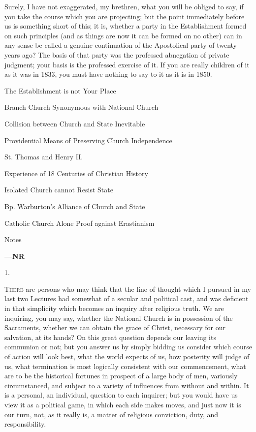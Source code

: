 Surely, I have not exaggerated, my brethren, what you will be
obliged to say, if you take the course which you are projecting; but
the point immediately before us is something short of this; it is,
whether a party in the Establishment formed on such principles (and as
things are now it can be formed on no other) can in any sense be
called a genuine continuation of the Apostolical party of twenty years
ago? The basis of that party was the professed abnegation of private
judgment; your basis is the professed exercise of it. If you are
really children of it as it was in 1833, you must have nothing to say
to it as it is in 1850.


The Establishment is not Your Place

Branch Church Synonymous
with National Church

Collision between Church and
State Inevitable

Providential Means of Preserving
Church Independence

St. Thomas and Henry II.

Experience of 18 Centuries of
Christian History

Isolated Church cannot Resist State

Bp. Warburton's Alliance of Church
and State

Catholic Church Alone Proof
against Erastianism

Notes

\textbf{—NR}

1.

T\textsc{here} are persons who may think that the line of thought which I
pursued in my last two Lectures had somewhat of a secular and
political cast, and was deficient in that simplicity which becomes an
inquiry after religious truth. We are inquiring, you may say, whether
the National Church is in possession of the Sacraments, whether we can
obtain the grace of Christ, necessary for our salvation, at its hands?
On this great question depends our leaving its communion or not; but
you answer us by simply bidding us consider which course of action
will look best, what the world expects of us, how posterity will judge
of us, what termination is most logically consistent with our
commencement, what are to be the historical fortunes in prospect of a
large body of men, variously circumstanced, and subject to a variety
of influences from without and within. It is a personal, an
individual, question to each inquirer; but you would have us view it
as a political game, in which each side makes moves, and just now it
is our turn, not, as it really is, a matter of religious conviction,
duty, and responsibility.

